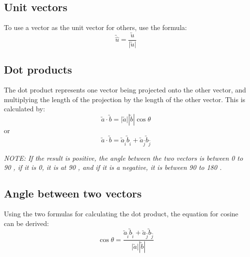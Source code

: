 \documentclass[a4paper,10pt]{report}
\newcommand{\note}[1]{\begin{center}\emph{NOTE: {#1}}\end{center}}
\begin{document}
\subsection{Unit vectors}
To use a vector as the unit vector for others, use the formula:
$$
	\utilde{\hat{u}} = \frac{\utilde{u}}{|\utilde{u}|}
$$

\subsection{Dot products}
The dot product represents one vector being projected onto the other vector, and multiplying the length of the projection by the length of the other vector.  This is calculated by:
$$\utilde{a} \cdot \utilde{b} = |\utilde{a}||\utilde{b}|\cos\theta$$
or
$$\utilde{a} \cdot \utilde{b} = \utilde{a}_{\hat{i}} \utilde{b}_{\hat{i}} + \utilde{a}_{\hat{j}} \utilde{b}_{\hat{j}}$$

\note{If the result is positive, the angle between the two vectors is between 0 to 90 \degree, if it is 0, it is at 90 \degree, and if it is a negative, it is between 90 to 180 \degree.}


\subsection{Angle between two vectors}
Using the two formulas for calculating the dot product, the equation for cosine can be derived:
$$
	\cos\theta = \frac{\utilde{a}_{\hat{i}} \utilde{b}_{\hat{i}} + \utilde{a}_{\hat{j}} \utilde{b}_{\hat{j}}}{|\utilde{a}||\utilde{b}|}
$$
\end{document}
